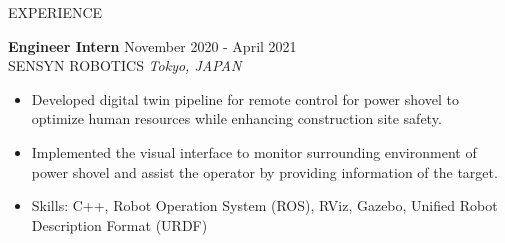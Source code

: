 \documentclass{resume} %
\begin{document}
\begin{rSection}{EXPERIENCE}

\textbf{Engineer Intern} \hfill November 2020 - April 2021\\
SENSYN ROBOTICS \hfill \textit{Tokyo, JAPAN}
 \begin{itemize}
    \itemsep -3pt {} 
     \item Developed digital twin pipeline for remote control for power shovel to optimize human resources while enhancing construction site safety.
     \item Implemented the visual interface to monitor surrounding environment of power shovel and assist the operator by providing information of the target. 

     \item Skills: C++, Robot Operation System (ROS), RViz, Gazebo, Unified Robot Description Format (URDF)
 \end{itemize}
 

\end{rSection} 

\end{document}
